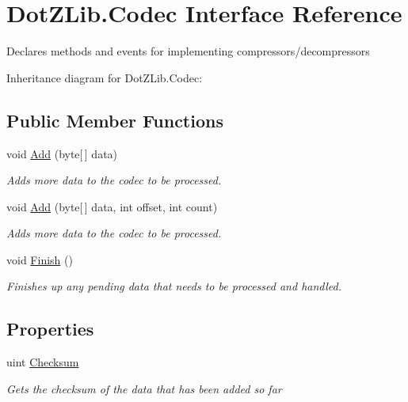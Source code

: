 \hypertarget{interface_dot_z_lib_1_1_codec}{\section{Dot\+Z\+Lib.\+Codec Interface Reference}
\label{interface_dot_z_lib_1_1_codec}
}


Declares methods and events for implementing compressors/decompressors  




Inheritance diagram for Dot\+Z\+Lib.\+Codec\+:
\subsection*{Public Member Functions}
\begin{DoxyCompactItemize}
\item 
void \hyperlink{interface_dot_z_lib_1_1_codec_aa40d0820bd95f098b3e7d8e707e7a536}{Add} (byte\mbox{[}$\,$\mbox{]} data)
\begin{DoxyCompactList}\small\item\em Adds more data to the codec to be processed. \end{DoxyCompactList}\item 
void \hyperlink{interface_dot_z_lib_1_1_codec_a137234d0c6fa6981ca8b602340e79dbc}{Add} (byte\mbox{[}$\,$\mbox{]} data, int offset, int count)
\begin{DoxyCompactList}\small\item\em Adds more data to the codec to be processed. \end{DoxyCompactList}\item 
void \hyperlink{interface_dot_z_lib_1_1_codec_af12b887d445dcbc5e7c11b3aa000aa27}{Finish} ()
\begin{DoxyCompactList}\small\item\em Finishes up any pending data that needs to be processed and handled. \end{DoxyCompactList}\end{DoxyCompactItemize}
\subsection*{Properties}
\begin{DoxyCompactItemize}
\item 
uint \hyperlink{interface_dot_z_lib_1_1_codec_aa5f968120138390af2648c956d4355cb}{Checksum}
\begin{DoxyCompactList}\small\item\em Gets the checksum of the data that has been added so far \end{DoxyCompactList}\end{DoxyCompactItemize}
